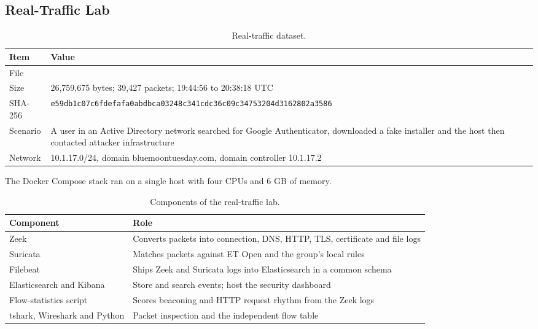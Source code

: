 \subsection{Real-Traffic Lab}

\begin{table}[htbp]
  \centering
  \caption{Real-traffic dataset.}
  \label{tab:real-dataset}
  \footnotesize
  \begin{tabularx}{\linewidth}{@{}lY@{}}
    \toprule
    \textbf{Item} & \textbf{Value} \\
    \midrule
    File &  \\
    Size & 26,759,675 bytes; 39,427 packets; 19:44:56 to 20:38:18 UTC \\
    SHA-256 & \texttt{\footnotesize e59db1c07c6fdefafa0abdbca03248c341cdc36c09c34753204d3162802a3586} \\
    Scenario & A user in an Active Directory network searched for Google Authenticator, downloaded a fake installer and the host then contacted attacker infrastructure \\
    Network & 10.1.17.0/24, domain bluemoontuesday.com, domain controller 10.1.17.2 \\
    \bottomrule
  \end{tabularx}
\end{table}

The Docker Compose stack ran on a single host with four CPUs and 6 GB of memory.

\begin{table}[htbp]
  \centering
  \caption{Components of the real-traffic lab.}
  \label{tab:real-components}
  \footnotesize
  \begin{tabularx}{\linewidth}{@{}lY@{}}
    \toprule
    \textbf{Component} & \textbf{Role} \\
    \midrule
    Zeek & Converts packets into connection, DNS, HTTP, TLS, certificate and file logs \\
    Suricata & Matches packets against ET Open and the group's local rules \\
    Filebeat & Ships Zeek and Suricata logs into Elasticsearch in a common schema \\
    Elasticsearch and Kibana & Store and search events; host the security dashboard \\
    Flow-statistics script & Scores beaconing and HTTP request rhythm from the Zeek logs \\
    tshark, Wireshark and Python & Packet inspection and the independent flow table \\
    \bottomrule
  \end{tabularx}
\end{table}
